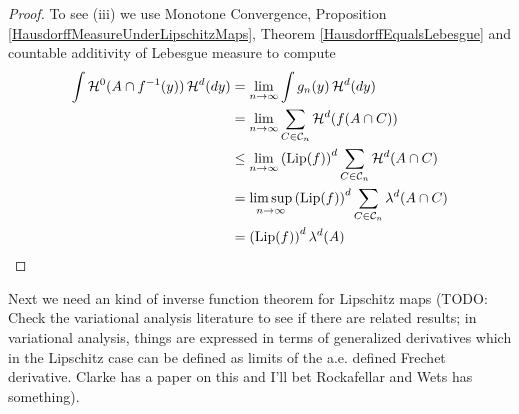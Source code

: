 \begin{proof}
To see (iii) we use Monotone Convergence, Proposition \ref{HausdorffMeasureUnderLipschitzMaps}, Theorem \ref{HausdorffEqualsLebesgue} and countable additivity of Lebesgue measure to compute
\begin{align*}
\int \mathcal{H}^0( A \cap f^{-1} (y)) \, \mathcal{H}^d(dy) &= \lim_{n \to \infty} \int g_n(y) \, \mathcal{H}^d(dy) \\
&=\lim_{n \to \infty} \sum_{C \in \mathcal{C}_n} \mathcal{H}^d(f(A \cap C)) \\
&\leq \lim_{n \to \infty} \left( \operatorname*{Lip}(f) \right)^d \sum_{C \in \mathcal{C}_n} \mathcal{H}^d(A \cap C) \\
&= \limsup_{n \to \infty} \left( \operatorname*{Lip}(f) \right)^d \sum_{C \in \mathcal{C}_n} \lambda^d(A \cap C) \\
&= \left( \operatorname*{Lip}(f) \right)^d \lambda^d(A) \\
\end{align*}
\end{proof}

Next we need an kind of inverse function theorem for Lipschitz maps (TODO: Check the variational analysis literature to see if there are related results; in variational analysis, things are expressed in terms of generalized derivatives which in the Lipschitz case can be defined as limits of the a.e. defined Frechet derivative.  Clarke has a paper on this and I'll bet Rockafellar and Wets has something).

